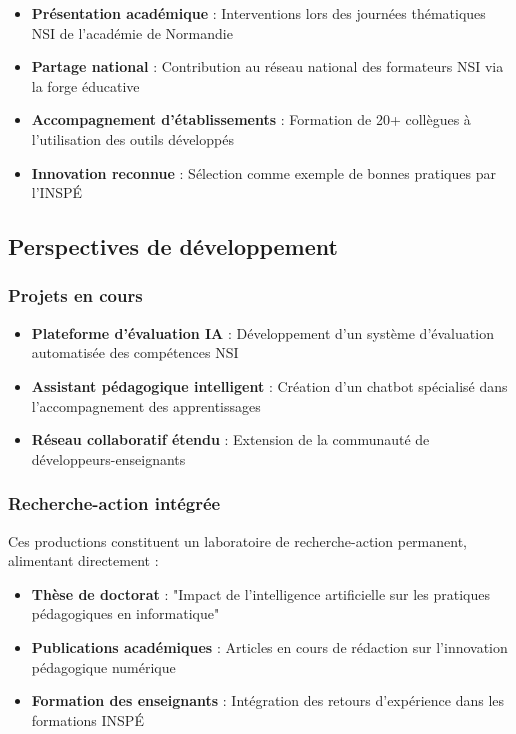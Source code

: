 \begin{itemize}[leftmargin=*]
    \item \textbf{Présentation académique} : Interventions lors des journées thématiques NSI de l'académie de Normandie
    \item \textbf{Partage national} : Contribution au réseau national des formateurs NSI via la forge éducative
    \item \textbf{Accompagnement d'établissements} : Formation de 20+ collègues à l'utilisation des outils développés
    \item \textbf{Innovation reconnue} : Sélection comme exemple de bonnes pratiques par l'INSPÉ
\end{itemize}

\subsection{Perspectives de développement}

\subsubsection{Projets en cours}

\begin{itemize}[leftmargin=*]
    \item \textbf{Plateforme d'évaluation IA} : Développement d'un système d'évaluation automatisée des compétences NSI
    \item \textbf{Assistant pédagogique intelligent} : Création d'un chatbot spécialisé dans l'accompagnement des apprentissages
    \item \textbf{Réseau collaboratif étendu} : Extension de la communauté de développeurs-enseignants
\end{itemize}

\subsubsection{Recherche-action intégrée}

Ces productions constituent un laboratoire de recherche-action permanent, alimentant directement :

\begin{itemize}[leftmargin=*]
    \item \textbf{Thèse de doctorat} : "Impact de l'intelligence artificielle sur les pratiques pédagogiques en informatique"
    \item \textbf{Publications académiques} : Articles en cours de rédaction sur l'innovation pédagogique numérique
    \item \textbf{Formation des enseignants} : Intégration des retours d'expérience dans les formations INSPÉ
\end{itemize}

